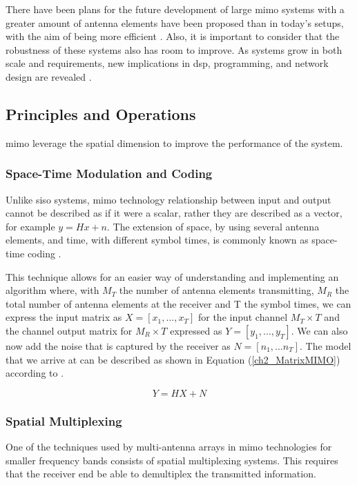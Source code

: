 \par There have been plans for the future development of large \ac{mimo} systems with a greater amount of antenna elements have been proposed than in today's setups, with the aim of being more efficient \cite{Zhang2006FutureNetworks}. Also, it is important to consider that the robustness of these systems also has room to improve. As systems grow in both scale and requirements, new implications in \ac{dsp}, programming, and network design are revealed \cite{Zhang2006FutureNetworks}. 

\subsection{Principles and Operations}
\par \ac{mimo} leverage the spatial dimension to improve the performance of the system. 

\subsubsection{Space-Time Modulation and Coding}
\par Unlike \ac{siso} systems, \ac{mimo} technology relationship between input and output cannot be described as if it were a scalar, rather they are described as a vector, for example $y=Hx+n$. The extension of space, by using several antenna elements, and time, with different symbol times, is commonly known as space-time coding \cite{Goldsmith2005WirelessCommunications}.

\par This technique allows for an easier way of understanding and implementing an algorithm where, with $M_{T}$ the number of antenna elements transmitting, $M_{R}$ the total number of antenna elements at the receiver and T the symbol times, we can express the input matrix as $X=[x_{1},...,x_{T}]$ for the input channel $M_{T}\times T$ and the channel output matrix for $M_{R}\times T$ expressed as $Y=[y_{1},...,y_{T}]$. We can also now add the noise that is captured by the receiver as $N=[n_{1},...n_{T}]$. The model that we arrive at can be described as shown in Equation (\ref{ch2_MatrixMIMO}) according to \citeauthor{Goldsmith2005WirelessCommunications}.

\begin{equation}
    \label{ch2_MatrixMIMO}
    Y=HX+N
\end{equation}

\subsubsection{Spatial Multiplexing}
\par One of the techniques used by multi-antenna arrays in \ac{mimo} technologies for smaller frequency bands consists of spatial multiplexing systems. This requires that the receiver end be able to demultiplex the transmitted information.

